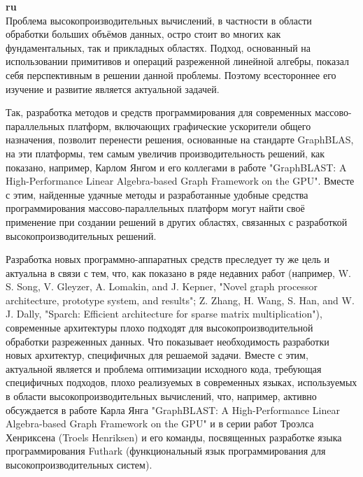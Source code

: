 \documentclass[12pt]{article}  %
\theoremstyle{remark}
\begin{document}
\textbf{ru}\\

Проблема высокопроизводительных вычислений, в частности в области обработки больших объёмов данных, остро стоит во многих как фундаментальных, так и прикладных областях. Подход, основанный на использовании примитивов и операций разреженной линейной алгебры, показал себя перспективным в решении данной проблемы. Поэтому всестороннее его изучение и развитие является актуальной задачей.

Так, разработка методов и средств программирования для современных массово-параллельных платформ, включающих графические ускорители общего назначения, позволит перенести решения, основанные на стандарте GraphBLAS, на эти платформы, тем самым увеличив производительность решений, как показано, например, Карлом Янгом и его коллегами в работе "GraphBLAST: A High-Performance Linear Algebra-based Graph Framework on the GPU". Вместе с этим, найденные удачные методы и разработанные удобные средства программирования массово-параллельных платформ могут найти своё применение при создании решений в других областях, связанных с разработкой высокопроизводительных решений. 

Разработка новых программно-аппаратных средств преследует ту же цель и актуальна в связи с тем, что, как показано в ряде недавних работ (например, W. S. Song, V. Gleyzer, A. Lomakin, and J. Kepner, "Novel graph
processor architecture, prototype system, and results"; Z. Zhang, H. Wang, S. Han, and W. J. Dally, "Sparch: Efficient architecture for sparse matrix multiplication"), современные архитектуры плохо подходят для высокопроизводительной обработки разреженных данных. Что показывает необходимость разработки новых архитектур, специфичных для решаемой задачи. Вместе с этим, актуальной является и проблема оптимизации исходного кода, требующая специфичных подходов, плохо реализуемых в современных языках, используемых в области высокопроизводительных вычислений, что, например, активно обсуждается в работе Карла Янга "GraphBLAST: A High-Performance Linear Algebra-based Graph Framework on the GPU" и в серии работ Троэлса Хенриксена (Troels Henriksen) и его команды, посвященных разработке языка программирования Futhark (функциональный язык программирования для высокопроизводительных систем). 
\end{document}
